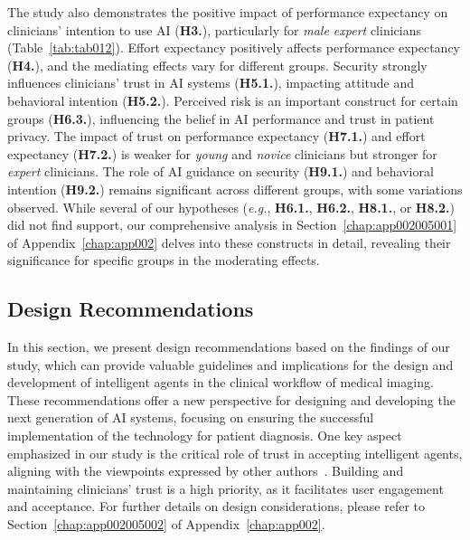 The study also demonstrates the positive impact of performance expectancy on clinicians' intention to use \ac{AI} ({\bf H3.}), particularly for {\it male expert} clinicians (Table~\ref{tab:tab012}).
Effort expectancy positively affects performance expectancy ({\bf H4.}), and the mediating effects vary for different groups.
Security strongly influences clinicians' trust in \ac{AI} systems ({\bf H5.1.}), impacting attitude and behavioral intention ({\bf H5.2.}).
Perceived risk is an important construct for certain groups ({\bf H6.3.}), influencing the belief in \ac{AI} performance and trust in patient privacy.
The impact of trust on performance expectancy ({\bf H7.1.}) and effort expectancy ({\bf H7.2.}) is weaker for {\it young} and {\it novice} clinicians but stronger for {\it expert} clinicians.
The role of \ac{AI} guidance on security ({\bf H9.1.}) and behavioral intention ({\bf H9.2.}) remains significant across different groups, with some variations observed.
While several of our hypotheses ({\it e.g.}, {\bf H6.1.}, {\bf H6.2.}, {\bf H8.1.}, or {\bf H8.2.}) did not find support, our comprehensive analysis in Section~\ref{chap:app002005001} of Appendix~\ref{chap:app002} delves into these constructs in detail, revealing their significance for specific groups in the moderating effects.

\subsection{Design Recommendations}
\label{sec:chap004006002}

In this section, we present design recommendations based on the findings of our study, which can provide valuable guidelines and implications for the design and development of intelligent agents in the clinical workflow of medical imaging.
These recommendations offer a new perspective for designing and developing the next generation of \ac{AI} systems, focusing on ensuring the successful implementation of the technology for patient diagnosis.
One key aspect emphasized in our study is the critical role of trust in accepting intelligent agents, aligning with the viewpoints expressed by other authors~\cite{LIU2022107026}.
Building and maintaining clinicians' trust is a high priority, as it facilitates user engagement and acceptance.
For further details on design considerations, please refer to Section~\ref{chap:app002005002} of Appendix~\ref{chap:app002}.

\vspace{1.50mm}

